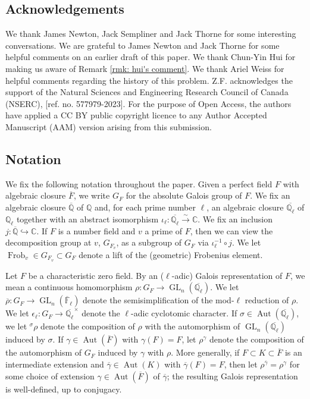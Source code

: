 \documentclass{amsart}
\theoremstyle{definition}
\numberwithin{equation}{section} %
\newcommand{\GL}{\operatorname{GL}}
\newcommand{\Aut}{\operatorname{Aut}}
\newcommand{\Qlbar}{\ensuremath{\overline{\mathbb{Q}_\ell}}}
\newcommand{\Frob}{\operatorname{Frob}}
\newcommand{\bb}[1]{\mathbb{#1}}
\newcommand{\ol}[1]{\overline{#1}}
\begin{document}
\subsection{Acknowledgements}

We thank James Newton, Jack Sempliner and Jack Thorne for some interesting conversations.
We are grateful to James Newton and Jack Thorne for some helpful comments on an earlier draft of this paper.
We thank Chun-Yin Hui for making us aware of Remark \ref{rmk: hui's comment}. 
We thank Ariel Weiss for helpful comments regarding the history of this problem.
Z.F. acknowledges the support of the Natural Sciences and Engineering Research Council of Canada (NSERC), [ref. no. 577979-2023].
For the purpose of Open Access, the authors have applied a CC BY public copyright licence to any Author Accepted Manuscript (AAM) version arising from this submission.

\subsection{Notation}

We fix the following notation throughout the paper.
Given a perfect field $F$ with algebraic closure $\ol{F}$, we write $G_F$ for the absolute Galois group of $F$.
We fix an algebraic closure $\ol{\bb{Q}}$ of $\bb{Q}$ and, for each prime number $\ell$, an algebraic closure $\Qlbar$ of $\bb{Q}_\ell$ together with an abstract isomorphism $\iota_\ell: \Qlbar \xrightarrow{\sim} \bb{C}$.
We fix an inclusion $j: \ol{\bb{Q}} \hookrightarrow \bb{C}$.
If $F$ is a number field and $v$ a prime of $F$, then we can view the decomposition group at $v$, $G_{F_v}$, as a subgroup of $G_F$ via $\iota_\ell^{-1} \circ j$.
We let $\Frob_v \in G_{F_v} \subset G_F$ denote a lift of the (geometric) Frobenius element.

Let $F$ be a characteristic zero field.
By an ($\ell$-adic) Galois representation of $F$, we mean a continuous homomorphism $\rho: G_F \to \GL_n(\Qlbar)$.
We let $\overline{\rho}: G_F \to \GL_n(\ol{\mathbb{F}}_\ell)$ denote the semisimplification of the mod-$\ell$ reduction of $\rho$.
We let $\epsilon_\ell: G_F \to \Qlbar^\times$ denote the $\ell$-adic cyclotomic character.
If $\sigma \in \Aut(\Qlbar)$, we let ${}^\sigma \rho$ denote the composition of $\rho$ with the automorphism of $\GL_n(\Qlbar)$ induced by $\sigma$.
If $\gamma \in \Aut(\ol{F})$ with $\gamma(F) = F$, let $\rho^\gamma$ denote the composition of the automorphism of $G_F$ induced by $\gamma$ with $\rho$.
More generally, if $F \subset K \subset \ol{F}$ is an intermediate extension and $\ol{\gamma} \in \Aut(K)$ with $\ol{\gamma}(F) = F$, then let $\rho^{\ol{\gamma}} = \rho^{\gamma}$ for some choice of extension $\gamma \in \Aut(\ol{F})$ of $\ol{\gamma}$; the resulting Galois representation is well-defined, up to conjugacy.
\end{document}
